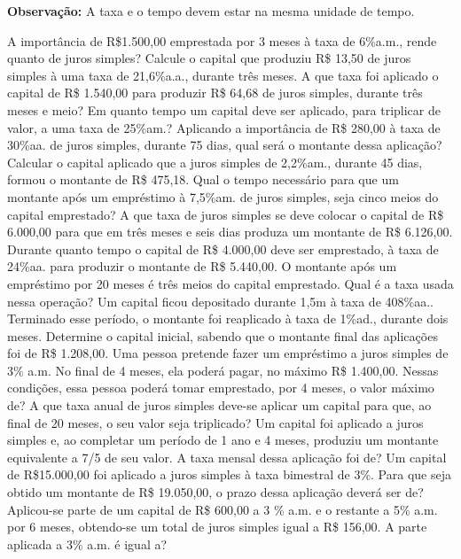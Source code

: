 \textbf{Observação:} A taxa e o tempo devem estar na mesma unidade de tempo.

\begin{exercicios}

    \exitem{} A importância de R\$1.500,00 emprestada por 3 meses à taxa de 6\%a.m., rende quanto de juros simples?
    \exitem{} Calcule o capital que produziu R\$ 13,50 de juros simples à uma taxa de 21,6\%a.a., durante três meses.
    \exitem{} A que taxa foi aplicado o capital de R\$ 1.540,00 para produzir R\$ 64,68 de juros simples, durante três meses e meio?
    \exitem{} Em quanto tempo um capital deve ser aplicado, para triplicar de valor, a uma taxa de 25\%am.?
    \exitem{} Aplicando a importância de R\$ 280,00 à taxa de 30\%aa. de juros simples, durante 75 dias, qual será o montante dessa aplicação?       				
    \exitem{} Calcular o capital aplicado que a juros simples de 2,2\%am., durante 45 dias, formou o montante de R\$ 475,18.        
    \exitem{} Qual o tempo necessário para que um montante após um empréstimo à 7,5\%am. de juros simples, seja cinco meios do capital emprestado?    			
    \exitem{} A que taxa de juros simples se deve colocar o capital de R\$ 6.000,00 para que em três meses e seis dias produza um montante de R\$ 6.126,00.    
    \exitem{} Durante quanto tempo o capital de R\$ 4.000,00 deve ser emprestado, à taxa de 24\%aa. para produzir o montante de R\$ 5.440,00.					
    \exitem{} O montante após um empréstimo por 20 meses é três meios do capital emprestado. Qual é a taxa usada nessa operação?  
    \exitem{} Um capital ficou depositado durante 1,5m à taxa de 408\%aa.. Terminado esse período, o montante foi reaplicado à taxa de 1\%ad., durante dois meses. Determine o capital inicial, sabendo que o montante final das aplicações foi de R\$ 1.208,00. 	
    \exitem{} Uma pessoa pretende fazer um empréstimo a juros simples de 3\% a.m. No final de 4 meses, ela poderá pagar, no máximo R\$ 1.400,00. Nessas condições, essa pessoa poderá tomar emprestado, por 4 meses, o valor máximo de?				
    \exitem{} A que taxa anual de juros simples deve-se aplicar um capital para que, ao final de 20 meses, o seu valor seja triplicado? 
    \exitem{} Um capital foi aplicado a juros simples e, ao completar um período de 1 ano e 4 meses, produziu um montante equivalente a 7/5 de seu valor. A taxa mensal dessa aplicação foi de? 
    \exitem{} Um  capital de R\$15.000,00 foi aplicado a juros simples à taxa bimestral de 3\%. Para que seja obtido um montante de R\$ 19.050,00, o prazo dessa aplicação deverá ser de?    
    \exitem{} Aplicou-se parte de um capital de R\$ 600,00 a 3 \% a.m. e o restante a 5\% a.m. por 6 meses, obtendo-se um total de juros simples igual a R\$ 156,00. A parte aplicada a 3\% a.m. é igual a? 


\end{exercicios}
